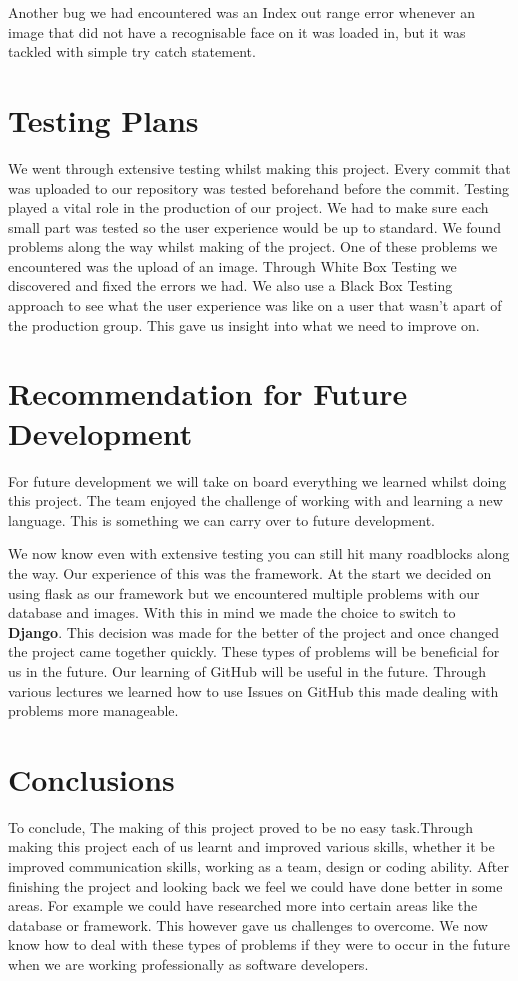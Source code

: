 \documentclass{article}
\begin{document}
\begin{flushleft}
Another bug we had encountered was an Index out range error whenever an image that did not have a recognisable face on it was loaded in, but it was tackled with simple try catch statement.

\section{Testing Plans}
We went through extensive testing whilst making this project. Every commit that was uploaded to our repository was tested beforehand before the commit.
Testing played a vital role in the production of our project. We had to make sure each small part was tested so the user experience would be up to standard. We found problems along the way whilst making of the project. One of these problems we encountered was the upload of an image. Through White Box Testing we discovered and fixed the errors we had. We also use a Black Box Testing approach to see what the user experience was like on a user that wasn't apart of the production group. This gave us insight into what we need to improve on.  

\section{Recommendation for Future Development}
For future development we will take on board everything we learned whilst doing this project. The team enjoyed the challenge of working with and learning a new language. This is something we can carry over to future development.

We now know even with extensive testing you can still hit many roadblocks along the way. Our experience of this was the framework. At the start we decided on using flask as our framework but we encountered multiple problems with our database and images. With this in mind we made the choice to switch to \textbf{Django}. This decision was made for the better of the project and once changed the project came together quickly. These types of problems will be beneficial for us in the future. Our learning of GitHub will be useful in the future. Through various lectures we learned how to use Issues on GitHub this made dealing with problems more manageable.


\section{Conclusions}
To conclude, \newline
The making of this project proved to be no easy task.Through making this project each of us learnt and improved various skills, whether it be improved communication skills, working as a team, design or coding ability. After finishing the project and looking back we feel we could have done better in some areas. For example we could have researched more into certain areas like the database or framework. This however gave us challenges to overcome. We now know how to deal with these types of problems if they were to occur in the future when we are working professionally as software developers.


\end{flushleft}
\end{document}
